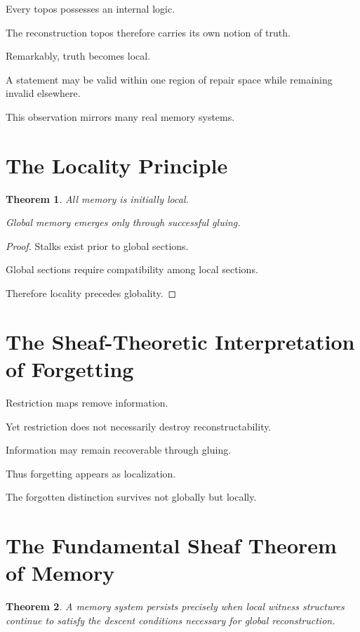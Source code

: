 \documentclass[12pt,oneside]{book}
\theoremstyle{plain} \newtheorem{theorem}{Theorem}[chapter] \newtheorem{lemma}[theorem]{Lemma} \newtheorem{proposition}[theorem]{Proposition} \newtheorem{corollary}[theorem]{Corollary}
\theoremstyle{definition} \newtheorem{definition}[theorem]{Definition} \newtheorem{axiom}[theorem]{Axiom} \newtheorem{construction}[theorem]{Construction}
\theoremstyle{remark} \newtheorem{remark}[theorem]{Remark} \newtheorem{example}[theorem]{Example}
\begin{document}
Every topos possesses an internal logic.

The reconstruction topos therefore carries its own notion of truth.

Remarkably, truth becomes local.

A statement may be valid within one region of repair space while remaining invalid elsewhere.

This observation mirrors many real memory systems.

\section{The Locality Principle}

\begin{theorem}

All memory is initially local.

Global memory emerges only through successful gluing.

\end{theorem}

\begin{proof}

Stalks exist prior to global sections.

Global sections require compatibility among local sections.

Therefore locality precedes globality.

\end{proof}

\section{The Sheaf-Theoretic Interpretation of Forgetting}

Restriction maps remove information.

Yet restriction does not necessarily destroy reconstructability.

Information may remain recoverable through gluing.

Thus forgetting appears as localization.

The forgotten distinction survives not globally but locally.

\section{The Fundamental Sheaf Theorem of Memory}

\begin{theorem}

A memory system persists precisely when local witness structures continue to satisfy the descent conditions necessary for global reconstruction.

\end{theorem}
\end{document}
